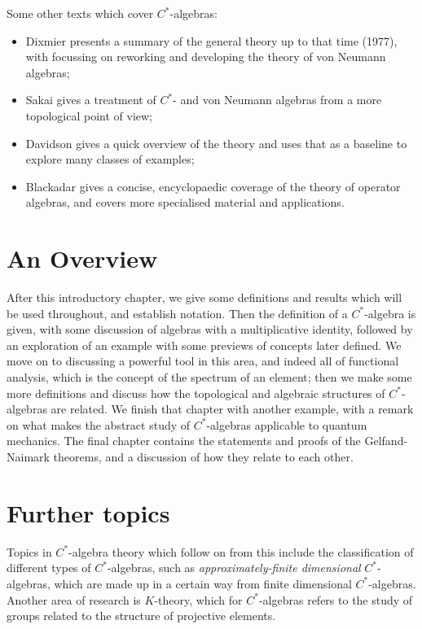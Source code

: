 \documentclass[12pt,a4paper]{report}
\theoremstyle{plain}
\theoremstyle{definition}
\newcommand{\1}{\mathbbm{1}}
\begin{document}
Some other texts which cover $C^\ast$-algebras: 
\begin{itemize}
	\item 	Dixmier \cite{dixmier77} presents a summary of the general theory up to that time (1977), 
	with \cite{dixmier81} focussing on reworking and developing the theory of von Neumann algebras; 
	\item 	Sakai \cite{sakai71} gives a treatment of $C^\ast$- and von Neumann algebras from a more 
	topological point of view; 
	\item	Davidson \cite{davidson96} gives a quick overview of the theory and uses that as a baseline 
	to explore many classes of examples;
	\item 	Blackadar \cite{blackadar06} gives a concise, encyclopaedic coverage of the theory of 
	operator algebras, and covers more specialised material and applications. 
\end{itemize}
	
\section{An Overview}

After this introductory chapter, we give some definitions and results which will be used throughout, and 
establish notation. Then the definition of a $C^\ast$-algebra is given, with some discussion of algebras 
with a multiplicative identity, followed by an exploration of an example with some previews of concepts 
later defined. We move on to discussing a powerful tool in this area, and indeed all of functional 
analysis, which is the concept of the spectrum of an element; then we make some more definitions and 
discuss how the topological and algebraic structures of $C^\ast$-algebras are related. We finish that 
chapter with another example, with a remark on what makes the abstract study of $C^\ast$-algebras 
applicable to quantum mechanics. The final chapter contains the statements and proofs of the 
Gelfand-Naimark theorems, and a discussion of how they relate to each other.



\section{Further topics}

Topics in $C^\ast$-algebra theory which follow on from this include the classification of different 
types of $C^\ast$-algebras, such as \emph{approximately-finite dimensional} $C^\ast$-algebras, which are 
made up in a certain way from finite dimensional $C^\ast$-algebras. 
Another area of research is $K$-theory, which for $C^\ast$-algebras refers to the study of groups 
related to the structure of projective elements.
\end{document}
